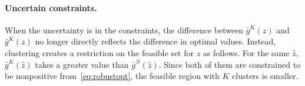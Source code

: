 {%


\paragraph{Uncertain constraints.}%
\label{par:uncertain_constraints_}
When the uncertainty is in the constraints, the difference between $\bar{g}^K(z)$ and $\bar{g}^K(z)$ no longer directly reflects the difference in optimal values.
Instead, clustering creates a restriction on the feasible set for $z$ as follows.
For the same $\hat{z}$, $\bar{g}^K(\hat{z})$ takes a greater value than $\bar{g}^N(\hat{z})$.
Since both of them are constrained to be nonpositive from~\eqref{eq:robustopt}, the feasible region with $K$ clusters is smaller.


}
